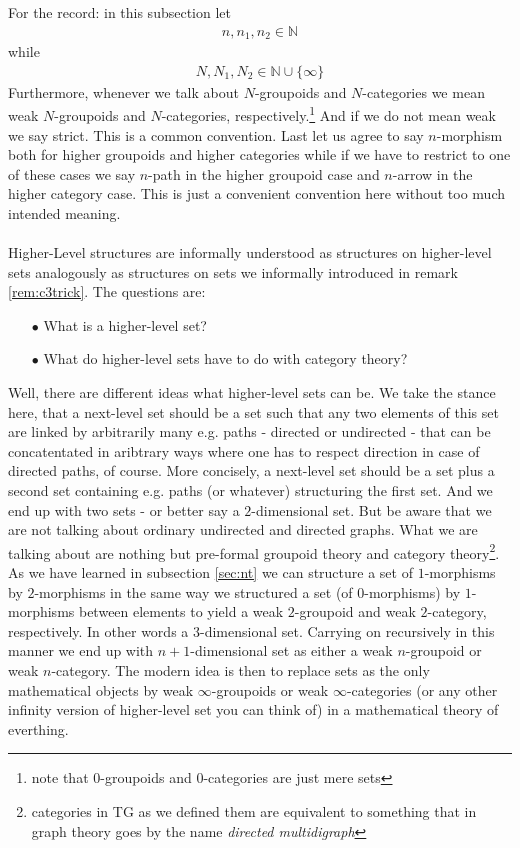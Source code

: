For the record: in this subsection let
\begin{align*}
  n,
  n_{1},
  n_{2}
  \in
  \mathbb{N}
\end{align*}
while
\begin{align*}
  N,
  N_{1},
  N_{2}
  \in
  \mathbb{N}
  \cup
  \lbrace
    \infty
  \rbrace
\end{align*}
Furthermore, whenever we talk about $N$-groupoids and $N$-categories we mean weak $N$-groupoids and $N$-categories, respectively.\footnote{note that $0$-groupoids and $0$-categories are just mere sets} And if we do not mean weak we say strict. This is a common convention. Last let us agree to say $n$-morphism both for higher groupoids and higher categories while if we have to restrict to one of these cases we say $n$-path in the higher groupoid case and $n$-arrow in the higher category case. This is just a convenient convention here without too much intended meaning.
\\\\
Higher-Level structures are informally understood as structures on higher-level sets analogously as structures on sets we informally introduced in remark \ref{rem:c3trick}. The questions are:
\begin{enumerate}
\item[$\bullet$]
What is a higher-level set?
\item[$\bullet$]
What do higher-level sets have to do with category theory?
\end{enumerate}
Well, there are different ideas what higher-level sets can be. We take the stance here, that a next-level set should be a set such that any two elements of this set are linked by arbitrarily many e.g. paths - directed or undirected - that can be concatentated in aribtrary ways where one has to respect direction in case of directed paths, of course. More concisely, a next-level set should be a set plus a second set containing e.g. paths (or whatever) structuring the first set. And we end up with two sets - or better say a $2$-dimensional set. But be aware that we are not talking about ordinary undirected and directed graphs. What we are talking about are nothing but pre-formal groupoid theory and category theory\footnote{categories in TG as we defined them are equivalent to something that in graph theory goes by the name \textit{directed multidigraph}}. As we have learned in subsection \ref{sec:nt} we can structure a set of $1$-morphisms by $2$-morphisms in the same way we structured a set (of $0$-morphisms) by $1$-morphisms between elements to yield a weak $2$-groupoid and weak $2$-category, respectively. In other words a $3$-dimensional set. Carrying on recursively in this manner we end up with $n+1$-dimensional set as either a weak $n$-groupoid or weak $n$-category. The modern idea is then to replace sets as the only mathematical objects by weak $\infty$-groupoids or weak $\infty$-categories (or any other infinity version of higher-level set you can think of) in a mathematical theory of everthing.
